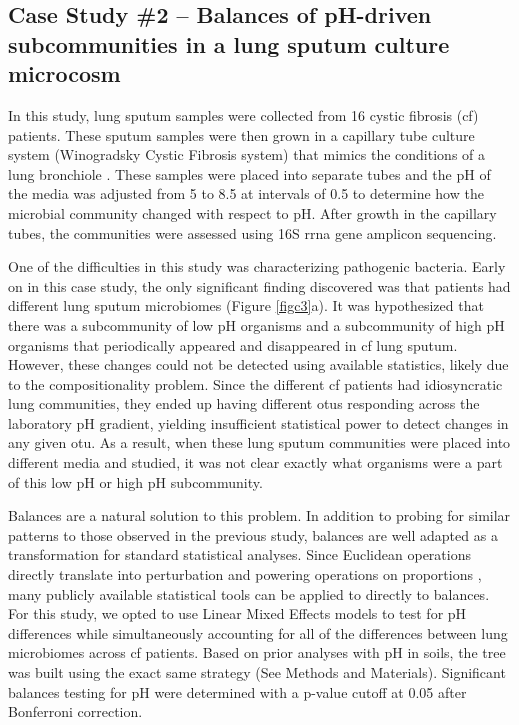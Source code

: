   \subsection{Case Study \#2 – Balances of pH-driven subcommunities in a lung sputum culture microcosm}
 In this study, lung sputum samples were collected from 16 cystic fibrosis (\gls{cf}) patients.  These sputum samples were then grown in a capillary tube culture system (Winogradsky Cystic Fibrosis system) that mimics the conditions of a lung bronchiole \cite{wincf}.  These samples were placed into separate tubes and the pH of the media was adjusted from 5 to 8.5 at intervals of 0.5 to determine how the microbial community changed with respect to pH.  After growth in the capillary tubes, the communities were assessed using 16S \gls{rrna} gene amplicon sequencing.\par
 One of the difficulties in this study was characterizing pathogenic bacteria.  Early on in this case study, the only significant finding discovered was that patients had different lung sputum microbiomes (Figure \ref{figc3}a). It was hypothesized that there was a subcommunity of low pH organisms and a subcommunity of high pH organisms that periodically appeared and disappeared in \gls{cf} lung sputum.  However, these changes could not be detected using available statistics, likely due to the compositionality problem.  Since the different \gls{cf} patients had idiosyncratic lung communities, they ended up having different \gls{otu}s responding across the laboratory pH gradient, yielding insufficient statistical power to detect changes in any given \gls{otu}.  As a result, when these lung sputum communities were placed into different media and studied, it was not clear exactly what organisms were a part of this low pH or high pH subcommunity.  \par
 Balances are a natural solution to this problem.  In addition to probing for similar patterns to those observed in the previous study, balances are well adapted as a transformation for standard statistical analyses.  Since Euclidean operations directly translate into perturbation and powering operations on proportions \cite{ilr, Pawlowsky-Glahn2015-qb}, many publicly available statistical tools can be applied to directly to balances.  For this study, we opted to use Linear Mixed Effects models to test for pH differences while simultaneously accounting for all of the differences between lung microbiomes across \gls{cf} patients.   Based on prior analyses with pH in soils, the tree was built using the exact same strategy (See Methods and Materials).   Significant balances testing for pH were determined with a p-value cutoff at 0.05 after Bonferroni correction.  \par
